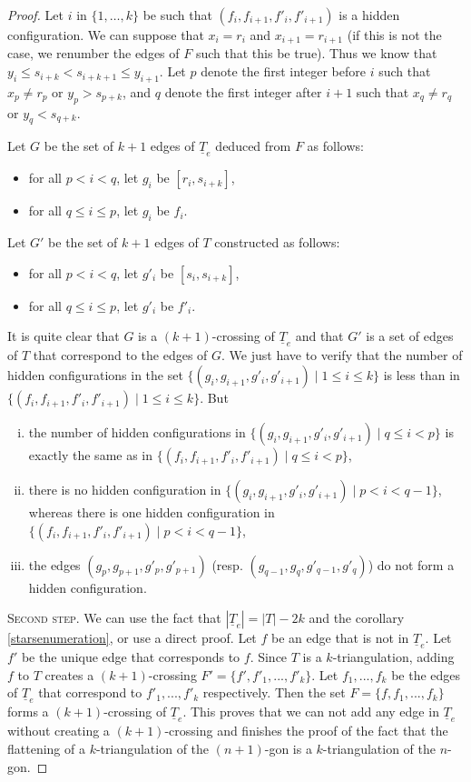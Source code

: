 \documentclass[12pt]{amsart}
\begin{document}
\begin{proof}
Let $i$ in $\{1,\ldots,k\}$ be such that $(f_i,f_{i+1},f'_i,f'_{i+1})$ is a hidden configuration. We can suppose that $x_i=r_i$ and $x_{i+1}=r_{i+1}$ (if this is not the case, we renumber the edges of $F$ such that this be true). Thus we know that $y_i\le s_{i+k}<s_{i+k+1}\le y_{i+1}$. Let $p$ denote the first integer before $i$ such that $x_p \ne r_p$ or $y_p>s_{p+k}$, and $q$ denote the first integer after $i+1$ such that $x_q \ne r_q$ or $y_q<s_{q+k}$.

Let $G$ be the set of $k+1$ edges of $\underline{T}_e$ deduced from $F$ as follows:
\begin{itemize}
\item for all $p<i<q$, let $g_i$ be $[r_i,s_{i+k}]$,
\item for all $q\le i\le p$, let $g_i$ be $f_i$.
\end{itemize}
Let $G'$ be the set of $k+1$ edges of $T$ constructed as follows:
\begin{itemize}
\item for all $p<i<q$, let $g'_i$ be $[s_i,s_{i+k}]$,
\item for all $q\le i\le p$, let $g'_i$ be $f'_i$.
\end{itemize}
		
It is quite clear that $G$ is a $(k+1)$-crossing of $\underline{T}_e$ and that $G'$ is a set of edges of $T$ that correspond to the edges of $G$. We just have to verify that the number of hidden configurations in the set $\{(g_i,g_{i+1},g'_i,g'_{i+1})\;|\; 1\le i\le k\}$ is less than in $\{(f_i,f_{i+1},f'_i,f'_{i+1})\;|\; 1\le i\le k\}$. But
\begin{enumerate}[(i)]
\item the number of hidden configurations in $\{(g_i,g_{i+1},g'_i,g'_{i+1})\;|\; q\le i<p\}$ is exactly the same as in $\{(f_i,f_{i+1},f'_i,f'_{i+1})\;|\; q\le i<p\}$,
\item there is no hidden configuration in $\{(g_i,g_{i+1},g'_i,g'_{i+1})\;|\; p<i<q-1\}$, whereas there is one hidden configuration in $\{(f_i,f_{i+1},f'_i,f'_{i+1})\;|\; p<i<q-1\}$,
\item the edges $(g_p,g_{p+1},g'_p,g'_{p+1})$ (resp. $(g_{q-1},g_q,g'_{q-1},g'_q)$) do not form a hidden configuration.
\end{enumerate}


\medskip
\noindent\textsc{Second step.}
We can use the fact that $|\underline{T}_e|=|T|-2k$ and the corollary \ref{starsenumeration}, or use a direct proof. Let $f$ be an edge that is not in $\underline{T}_e$. Let $f'$ be the unique edge that corresponds to $f$. Since $T$ is a $k$-triangulation, adding $f$ to $T$ creates a $(k+1)$-crossing $F'=\{f',f'_1,...,f'_k\}$. Let $f_1,...,f_k$ be the edges of $\underline{T}_e$ that correspond to $f'_1,...,f'_k$ respectively. Then the set $F=\{f,f_1,...,f_k\}$ forms a $(k+1)$-crossing of $\underline{T}_e$. This proves that we can not add any edge in $\underline{T}_e$ without creating a $(k+1)$-crossing and finishes the proof of the fact that the flattening of a $k$-triangulation of the $(n+1)$-gon is a $k$-triangulation of the $n$-gon.


\end{proof}
\end{document}
